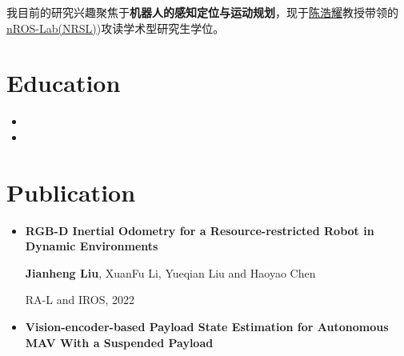\documentclass[11pt,a4paper,sans]{moderncv}        %
\begin{document}
\makecvtitle

\small{我目前的研究兴趣聚焦于\textbf{机器人的感知定位与运动规划}，现于\href{faculty.hitsz.edu.cn/chenhaoyao}{陈浩耀}教授带领的\href{http://nrs-lab.com/}{nROS-Lab(NRSL)})攻读学术型研究生学位。

\section{Education}

\vspace{5pt}

\begin{itemize}

\item{}

\item{}

\end{itemize}

\vspace{2pt}

\section{Publication}

\vspace{5pt}

\begin{itemize}
    

\item{\textbf{RGB-D Inertial Odometry for a Resource-restricted Robot in Dynamic Environments}

\small{\textbf{Jianheng Liu}, XuanFu Li, Yueqian Liu and Haoyao Chen}

\small{RA-L and IROS, 2022}
}

\vspace{3pt}

\item{\textbf{Vision-encoder-based Payload State Estimation for Autonomous MAV With a Suspended Payload}

}
\end{itemize}}
\end{document}
